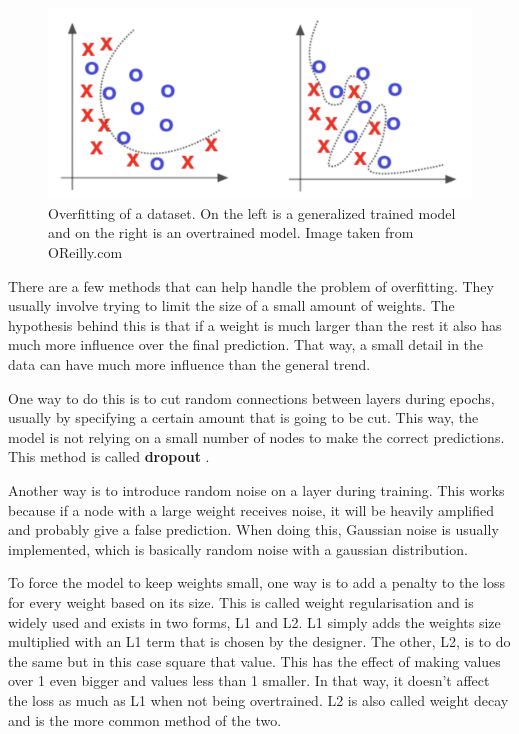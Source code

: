 \begin{figure}[hbtp]
\begin{center}
\includegraphics[width = 1.0\textwidth]{./Images/overfitting.jpg} 
\caption{Overfitting of a dataset. On the left is a generalized trained model and on the right is an overtrained model. Image taken from OReilly.com \cite{overfitting}}
\label{fig:overfitting}
\end{center}
\end{figure}

There are a few methods that can help handle the problem of overfitting. They usually involve trying to limit the size of a small amount of weights.
The hypothesis behind this is that if a weight is much larger than the rest it also has much more influence over the final prediction. That way, a small detail in the data can have much more influence than the general trend.

One way to do this is to cut random connections between layers during epochs, usually by specifying a certain amount that is going to be cut.
This way, the model is not relying on a small number of nodes to make the correct predictions. This method is called \textbf{dropout} \cite{dropout}.

Another way is to introduce random noise on a layer during training. This works because if a node with a large weight receives noise, it will be heavily amplified and probably give a false prediction.
When doing this, Gaussian noise is usually implemented, which is basically random noise with a gaussian distribution.

To force the model to keep weights small, one way is to add a penalty to the loss for every weight based on its size. 
This is called weight regularisation and is widely used and exists in two forms, L1 and L2.
L1 simply adds the weights size multiplied with an L1 term that is chosen by the designer.
The other, L2, is to do the same but in this case square that value. This has the effect of making values over 1 even bigger and values less than 1 smaller.
In that way, it doesn't affect the loss as much as L1 when not being overtrained. L2 is also called weight decay and is the more common method of the two.

